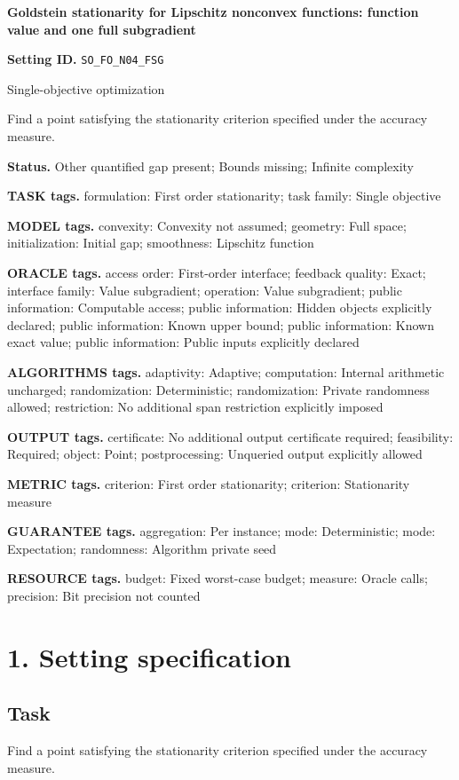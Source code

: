 \documentclass[10pt,a4paper]{article}
\begin{document}
\raggedright

{\LARGE\bfseries\sffamily\color{AtlasNavy} Goldstein stationarity for Lipschitz nonconvex functions: function value and one full subgradient\par}\vspace{5pt}
\textbf{Setting ID.} \texttt{SO\_\allowbreak{}FO\_\allowbreak{}N04\_\allowbreak{}FSG}

Single-objective optimization

Find a point satisfying the stationarity criterion specified under the accuracy measure.

\textbf{Status.} Other quantified gap present; Bounds missing; Infinite complexity

\textbf{TASK tags.} formulation: First order stationarity; task family: Single objective

\textbf{MODEL tags.} convexity: Convexity not assumed; geometry: Full space; initialization: Initial gap; smoothness: Lipschitz function

\textbf{ORACLE tags.} access order: First-order interface; feedback quality: Exact; interface family: Value subgradient; operation: Value subgradient; public information: Computable access; public information: Hidden objects explicitly declared; public information: Known upper bound; public information: Known exact value; public information: Public inputs explicitly declared

\textbf{ALGORITHMS tags.} adaptivity: Adaptive; computation: Internal arithmetic uncharged; randomization: Deterministic; randomization: Private randomness allowed; restriction: No additional span restriction explicitly imposed

\textbf{OUTPUT tags.} certificate: No additional output certificate required; feasibility: Required; object: Point; postprocessing: Unqueried output explicitly allowed

\textbf{METRIC tags.} criterion: First order stationarity; criterion: Stationarity measure

\textbf{GUARANTEE tags.} aggregation: Per instance; mode: Deterministic; mode: Expectation; randomness: Algorithm private seed

\textbf{RESOURCE tags.} budget: Fixed worst-case budget; measure: Oracle calls; precision: Bit precision not counted

\section{1. Setting specification}
\subsection{Task}
Find a point satisfying the stationarity criterion specified under the accuracy measure.
\end{document}
